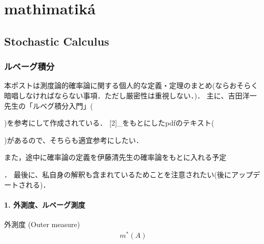 \documentclass[letterpaper,10pt,english]{sphinxmanual}
\begin{document}
\chapter{mathimatiká}
\label{\detokenize{index:mathimatika}}
\sphinxstepscope


\section{Stochastic Calculus}
\label{\detokenize{src/stochasticcalculus/index:stochastic-calculus}}\label{\detokenize{src/stochasticcalculus/index::doc}}
\sphinxstepscope


\subsection{ルベーグ積分}
\label{\detokenize{src/stochasticcalculus/2020-03-16-lebesgue:id1}}\label{\detokenize{src/stochasticcalculus/2020-03-16-lebesgue::doc}}


\sphinxAtStartPar
本ポストは測度論的確率論に関する個人的な定義・定理のまとめ(ならおそらく暗唱しなければならない事項．ただし厳密性は重視しない．)．
主に、吉田洋一先生の「ルベグ積分入門」( %
\begin{footnote}[1]\sphinxAtStartFootnote
{}
%
\end{footnote})を参考にして作成されている．
{[}2{]}\_をもとにしたpdfのテキスト( %
\begin{footnote}[3]\sphinxAtStartFootnote
{}
%
\end{footnote})があるので、そちらも適宜参考にしたい．

\sphinxAtStartPar
また，途中に確率論の定義を伊藤清先生の確率論をもとに入れる予定 %
\begin{footnote}[4]\sphinxAtStartFootnote
{}
%
\end{footnote}．
最後に、私自身の解釈も含まれているためことを注意されたい(後にアップデートされる)．


\subsubsection{1. 外測度、ルベーグ測度}
\label{\detokenize{src/stochasticcalculus/2020-03-16-lebesgue:id5}}
 外測度 (Outer measure)
\begin{equation*}
\begin{split}m^{\ast}(A)\end{split}
\end{equation*}
\end{document}
